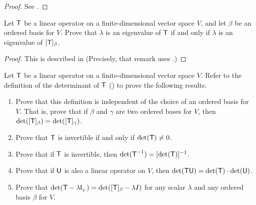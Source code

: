 \begin{proof}
See .
\end{proof}

\begin{exercise} \label{exercise 5.1.7}
Let \(\textsf{T}\) be a linear operator on a finite-dimensional vector space \(V\), and let \(\beta\) be an ordered basis for \(V\).
Prove that \(\lambda\) is an eigenvalue of \(\textsf{T}\) if
and only if \(\lambda\) is an eigenvalue of \([\textsf{T}]_{\beta}\).
\end{exercise}

\begin{proof}
This is described in  (Precisely, that remark uses .)
\end{proof}

\begin{exercise} \label{exercise 5.1.8}
Let \(\textsf{T}\) be a linear operator on a finite-dimensional vector space \(V\).
Refer to the definition of the determinant of \(\textsf{T}\) () to prove the following results.
\begin{enumerate}
\item Prove that this definition is independent of the choice of an ordered basis for \(V\).
That is, prove that if \(\beta\) and \(\gamma\) are two ordered bases for \(V\), then \(\det([\textsf{T}]_{\beta}) = \det([\textsf{T}]_{\gamma})\).
\item Prove that \(\textsf{T}\) is invertible if and only if \(\det(\textsf{T}) \ne 0\).
\item Prove that if \(\textsf{T}\) is invertible, then \(\det(\textsf{T}^{-1}) = [\det(\textsf{T})]^{-1}\).
\item Prove that if \(\textsf{U}\) is also a linear operator on \(V\), then \(\det(\textsf{T}\textsf{U}) = \det(\textsf{T}) \cdot \det(\textsf{U})\).
\item Prove that \(\det(\textsf{T} - \lambda \textsf{I}_{_V}) = \det([\textsf{T}]_{\beta} - \lambda I)\) for any scalar \(\lambda\) and any ordered basis \(\beta\) for \(V\).
\end{enumerate}
\end{exercise}

